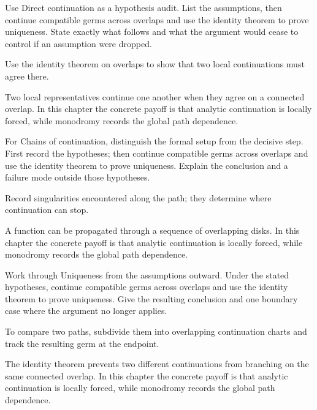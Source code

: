 \begin{exercise}\label{exr:iv15-02}
Use Direct continuation as a hypothesis audit. List the assumptions, then continue compatible germs across overlaps and use the identity theorem to prove uniqueness. State exactly what follows and what the argument would cease to control if an assumption were dropped.
\end{exercise}
\begin{hint}
Use the identity theorem on overlaps to show that two local continuations must agree there.
\end{hint}
\begin{solution}
Two local representatives continue one another when they agree on a connected overlap. In this chapter the concrete payoff is that analytic continuation is locally forced, while monodromy records the global path dependence.
\end{solution}

\begin{exercise}\label{exr:iv15-03}
For Chains of continuation, distinguish the formal setup from the decisive step. First record the hypotheses; then continue compatible germs across overlaps and use the identity theorem to prove uniqueness. Explain the conclusion and a failure mode outside those hypotheses.
\end{exercise}
\begin{hint}
Record singularities encountered along the path; they determine where continuation can stop.
\end{hint}
\begin{solution}
A function can be propagated through a sequence of overlapping disks. In this chapter the concrete payoff is that analytic continuation is locally forced, while monodromy records the global path dependence.
\end{solution}

\begin{exercise}\label{exr:iv15-04}
Work through Uniqueness from the assumptions outward. Under the stated hypotheses, continue compatible germs across overlaps and use the identity theorem to prove uniqueness. Give the resulting conclusion and one boundary case where the argument no longer applies.
\end{exercise}
\begin{hint}
To compare two paths, subdivide them into overlapping continuation charts and track the resulting germ at the endpoint.
\end{hint}
\begin{solution}
The identity theorem prevents two different continuations from branching on the same connected overlap. In this chapter the concrete payoff is that analytic continuation is locally forced, while monodromy records the global path dependence.
\end{solution}

